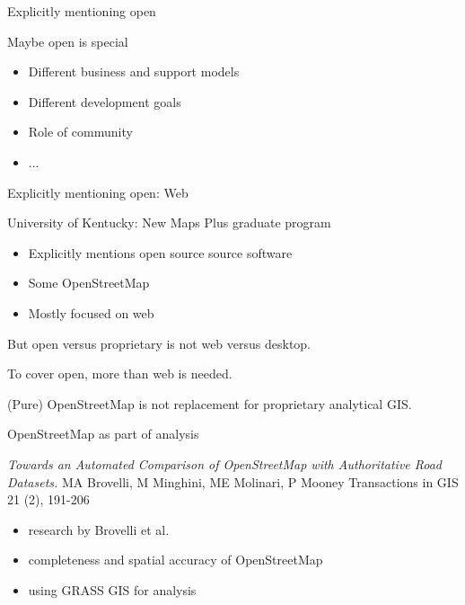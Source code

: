 \documentclass[xcolor={dvipsnames,usenames},beamer,aspectratio=169]{beamer}
\begin{document}
\begin{frame}{Explicitly mentioning open}

\begin{block}{Maybe open is special}
\begin{itemize}
 \item Different business and support models
 \item Different development goals
 \item Role of community
 \item ...
\end{itemize}
\end{block}

\end{frame}

\begin{frame}{Explicitly mentioning open: Web}

\begin{block}{University of Kentucky: New Maps Plus graduate program}
\begin{itemize}
 \item Explicitly mentions open source source software
 \item Some OpenStreetMap
 \item Mostly focused on web
\end{itemize}
\end{block}

But open versus proprietary is not web versus desktop.

\textrightarrow To cover open, more than web is needed.

\textrightarrow
(Pure) OpenStreetMap is not replacement
for proprietary analytical GIS.

\end{frame}

\begin{frame}{OpenStreetMap as part of analysis}

\begin{block}{}
\emph{Towards an Automated Comparison of OpenStreetMap
with Authoritative Road Datasets.}
MA Brovelli, M Minghini, ME Molinari, P Mooney
Transactions in GIS 21 (2), 191-206
\begin{itemize}
 \item research by Brovelli et al.
 \item completeness and spatial accuracy of OpenStreetMap
 \item using GRASS GIS for analysis
\end{itemize}
\end{block}

\end{frame}
\end{document}
